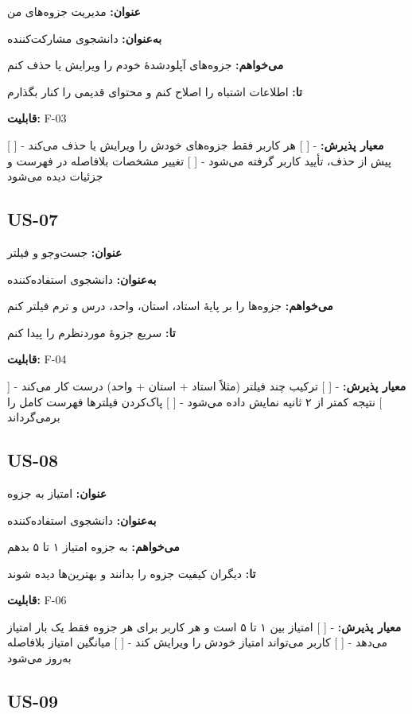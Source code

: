 \documentclass[12pt, a4paper]{article}
\begin{document}
\textbf{عنوان:} مدیریت جزوه‌های من

\textbf{به‌عنوان:} دانشجوی مشارکت‌کننده

\textbf{می‌خواهم:} جزوه‌های آپلودشدهٔ خودم را ویرایش یا حذف کنم

\textbf{تا:} اطلاعات اشتباه را اصلاح کنم و محتوای قدیمی را کنار بگذارم

\textbf{قابلیت:} F-03

\textbf{معیار پذیرش:}
- {[} {]} هر کاربر فقط جزوه‌های خودش را ویرایش یا حذف می‌کند
- {[} {]} پیش از حذف، تأیید کاربر گرفته می‌شود
- {[} {]} تغییر مشخصات بلافاصله در فهرست و جزئیات دیده می‌شود

\subsection{US-07}

\textbf{عنوان:} جست‌وجو و فیلتر

\textbf{به‌عنوان:} دانشجوی استفاده‌کننده

\textbf{می‌خواهم:} جزوه‌ها را بر پایهٔ استاد، استان، واحد، درس و ترم فیلتر کنم

\textbf{تا:} سریع جزوهٔ موردنظرم را پیدا کنم

\textbf{قابلیت:} F-04

\textbf{معیار پذیرش:}
- {[} {]} ترکیب چند فیلتر (مثلاً استاد + استان + واحد) درست کار می‌کند
- {[} {]} نتیجه کمتر از ۲ ثانیه نمایش داده می‌شود
- {[} {]} پاک‌کردن فیلترها فهرست کامل را برمی‌گرداند

\subsection{US-08}

\textbf{عنوان:} امتیاز به جزوه

\textbf{به‌عنوان:} دانشجوی استفاده‌کننده

\textbf{می‌خواهم:} به جزوه امتیاز ۱ تا ۵ بدهم

\textbf{تا:} دیگران کیفیت جزوه را بدانند و بهترین‌ها دیده شوند

\textbf{قابلیت:} F-06

\textbf{معیار پذیرش:}
- {[} {]} امتیاز بین ۱ تا ۵ است و هر کاربر برای هر جزوه فقط یک بار امتیاز می‌دهد
- {[} {]} کاربر می‌تواند امتیاز خودش را ویرایش کند
- {[} {]} میانگین امتیاز بلافاصله به‌روز می‌شود

\subsection{US-09}
\end{document}
